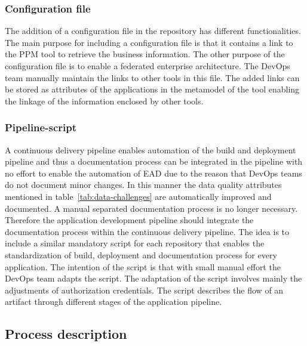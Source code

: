 \subsubsection{Configuration file}

The addition of a configuration file in the repository has different functionalities. The main purpose for including a configuration file is that it contains a link to the PPM tool to retrieve the business information. The other purpose of the configuration file is to enable a federated enterprise architecture. The DevOps team manually maintain the links to other tools in this file. The added links can be stored as attributes of the applications in the metamodel of the tool enabling the linkage of the information enclosed by other tools.

\subsubsection{Pipeline-script}

A continuous delivery pipeline enables automation of the build and deployment pipeline and thus a documentation process can be integrated in the pipeline with no effort to enable the automation of EAD due to the reason that DevOps teams do not document minor changes. 
In this manner the data quality attributes mentioned in table~\ref{tab:data-challenges} are automatically improved and documented. A manual separated documentation process is no longer necessary. Therefore the application development pipeline should integrate the documentation process within the continuous delivery pipeline. The idea is to include a similar mandatory script for each repository that enables the standardization of build, deployment and documentation process for every application. The intention of the script is that with small manual effort the DevOps team adapts the script. The adaptation of the script involves mainly the adjustments of authorization credentials. The script describes the flow of an artifact through different stages of the application pipeline. \cite{Nicolaescu2017}

\subsection{Process description}\label{subsection:processdescription}

